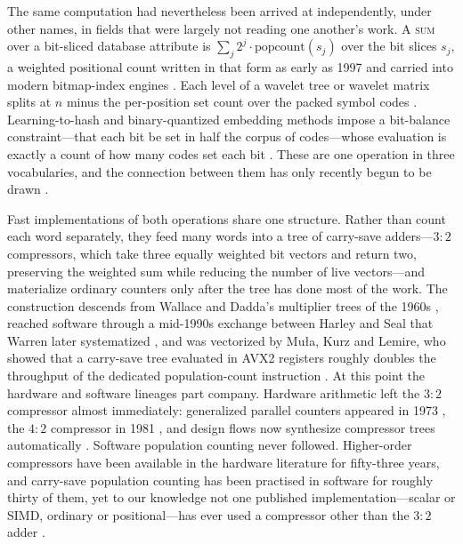 \documentclass[fleqn,10pt]{wlscirep}
\begin{document}
The same computation had nevertheless been arrived at independently, under other names, in fields that were largely not reading one another's work. A \textsc{sum} over a bit-sliced database attribute is $\sum_j 2^j\cdot\mathrm{popcount}(s_j)$ over the bit slices $s_j$, a weighted positional count written in that form as early as 1997 \cite{oneil1997,rinfret2001} and carried into modern bitmap-index engines \cite{cubit2024}. Each level of a wavelet tree or wavelet matrix splits at $n$ minus the per-position set count over the packed symbol codes \cite{dinklage2021,claude2012wavelet}. Learning-to-hash and binary-quantized embedding methods impose a bit-balance constraint---that each bit be set in half the corpus of codes---whose evaluation is exactly a count of how many codes set each bit \cite{weiss2008spectral,gong2013iterative}. These are one operation in three vocabularies, and the connection between them has only recently begun to be drawn \cite{clausecker2024}.

Fast implementations of both operations share one structure. Rather than count each word separately, they feed many words into a tree of carry-save adders---$3{:}2$ compressors, which take three equally weighted bit vectors and return two, preserving the weighted sum while reducing the number of live vectors---and materialize ordinary counters only after the tree has done most of the work. The construction descends from Wallace and Dadda's multiplier trees of the 1960s \cite{wallace1964,dadda1965}, reached software through a mid-1990s exchange between Harley and Seal that Warren later systematized \cite{warren2007,warren2013}, and was vectorized by Mu{\l}a, Kurz and Lemire, who showed that a carry-save tree evaluated in AVX2 registers roughly doubles the throughput of the dedicated population-count instruction \cite{Mula2016}. At this point the hardware and software lineages part company. Hardware arithmetic left the $3{:}2$ compressor almost immediately: generalized parallel counters appeared in 1973 \cite{swartzlander1973}, the $4{:}2$ compressor in 1981 \cite{weinberger1981}, and design flows now synthesize compressor trees automatically \cite{verma2007}. Software population counting never followed. Higher-order compressors have been available in the hardware literature for fifty-three years, and carry-save population counting has been practised in software for roughly thirty of them, yet to our knowledge not one published implementation---scalar or SIMD, ordinary or positional---has ever used a compressor other than the $3{:}2$ adder \cite{warren2007,warren2013,Mula2016,klarqvist2019,clausecker2024}.
\end{document}
